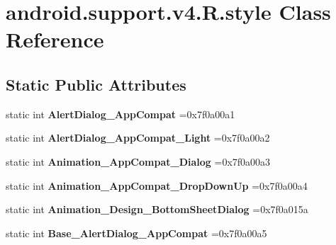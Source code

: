 \hypertarget{classandroid_1_1support_1_1v4_1_1R_1_1style}{}\section{android.\+support.\+v4.\+R.\+style Class Reference}
\label{classandroid_1_1support_1_1v4_1_1R_1_1style}
\subsection*{Static Public Attributes}
\begin{DoxyCompactItemize}
\item 
\mbox{\label{classandroid_1_1support_1_1v4_1_1R_1_1style_a4ba4011f30f2320a734629682fb92873}} 
static int {\bfseries Alert\+Dialog\+\_\+\+App\+Compat} =0x7f0a00a1
\item 
\mbox{\label{classandroid_1_1support_1_1v4_1_1R_1_1style_af4d4e304719f70873d467866ce5c4e61}} 
static int {\bfseries Alert\+Dialog\+\_\+\+App\+Compat\+\_\+\+Light} =0x7f0a00a2
\item 
\mbox{\label{classandroid_1_1support_1_1v4_1_1R_1_1style_afbe0f6a37d673cf790b7e4e6cc787977}} 
static int {\bfseries Animation\+\_\+\+App\+Compat\+\_\+\+Dialog} =0x7f0a00a3
\item 
\mbox{\label{classandroid_1_1support_1_1v4_1_1R_1_1style_a50380c2d19eef835d3a4651144bbc49b}} 
static int {\bfseries Animation\+\_\+\+App\+Compat\+\_\+\+Drop\+Down\+Up} =0x7f0a00a4
\item 
\mbox{\label{classandroid_1_1support_1_1v4_1_1R_1_1style_a56ba6f91a78f46ae8b8cf3b31d8056d1}} 
static int {\bfseries Animation\+\_\+\+Design\+\_\+\+Bottom\+Sheet\+Dialog} =0x7f0a015a
\item 
\mbox{\label{classandroid_1_1support_1_1v4_1_1R_1_1style_a0996feed07c1931b0ff4f48a5d659a2a}} 
static int {\bfseries Base\+\_\+\+Alert\+Dialog\+\_\+\+App\+Compat} =0x7f0a00a5
\item 
\mbox{\label{classandroid_1_1support_1_1v4_1_1R_1_1style_a0811f0b2b90684abcf2f5bd8c435c5c8}} 

\end{DoxyCompactItemize}
